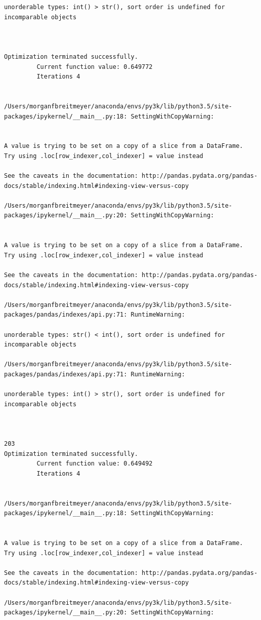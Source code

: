 \begin{lstlisting}
unorderable types: int() > str(), sort order is undefined for incomparable objects



Optimization terminated successfully.
         Current function value: 0.649772
         Iterations 4


/Users/morganfbreitmeyer/anaconda/envs/py3k/lib/python3.5/site-packages/ipykernel/__main__.py:18: SettingWithCopyWarning:


A value is trying to be set on a copy of a slice from a DataFrame.
Try using .loc[row_indexer,col_indexer] = value instead

See the caveats in the documentation: http://pandas.pydata.org/pandas-docs/stable/indexing.html#indexing-view-versus-copy

/Users/morganfbreitmeyer/anaconda/envs/py3k/lib/python3.5/site-packages/ipykernel/__main__.py:20: SettingWithCopyWarning:


A value is trying to be set on a copy of a slice from a DataFrame.
Try using .loc[row_indexer,col_indexer] = value instead

See the caveats in the documentation: http://pandas.pydata.org/pandas-docs/stable/indexing.html#indexing-view-versus-copy

/Users/morganfbreitmeyer/anaconda/envs/py3k/lib/python3.5/site-packages/pandas/indexes/api.py:71: RuntimeWarning:

unorderable types: str() < int(), sort order is undefined for incomparable objects

/Users/morganfbreitmeyer/anaconda/envs/py3k/lib/python3.5/site-packages/pandas/indexes/api.py:71: RuntimeWarning:

unorderable types: int() > str(), sort order is undefined for incomparable objects



203
Optimization terminated successfully.
         Current function value: 0.649492
         Iterations 4


/Users/morganfbreitmeyer/anaconda/envs/py3k/lib/python3.5/site-packages/ipykernel/__main__.py:18: SettingWithCopyWarning:


A value is trying to be set on a copy of a slice from a DataFrame.
Try using .loc[row_indexer,col_indexer] = value instead

See the caveats in the documentation: http://pandas.pydata.org/pandas-docs/stable/indexing.html#indexing-view-versus-copy

/Users/morganfbreitmeyer/anaconda/envs/py3k/lib/python3.5/site-packages/ipykernel/__main__.py:20: SettingWithCopyWarning:



\end{lstlisting}
